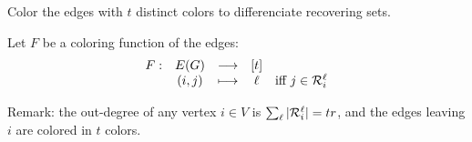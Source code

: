      \begin{frame}
        Color the edges with $t$ distinct colors to differenciate recovering sets.
        
        Let $F$ be a coloring function of the edges:
        $$
            \begin{array}{ccccc}
                F: & E(G) & \longrightarrow & [t]  & \\
                   &(i,j) & \longmapsto     & \ell & \mbox{iff } j \in \mathcal{R}_i^\ell
            \end{array}
        $$
        
    Remark: the out-degree of any vertex $i \in V$ is $\sum_\ell \vert \mathcal{R}_i^\ell \vert = tr$, and the edges leaving $i$ are colored in $t$ colors.
    
    \end{frame}    
    
